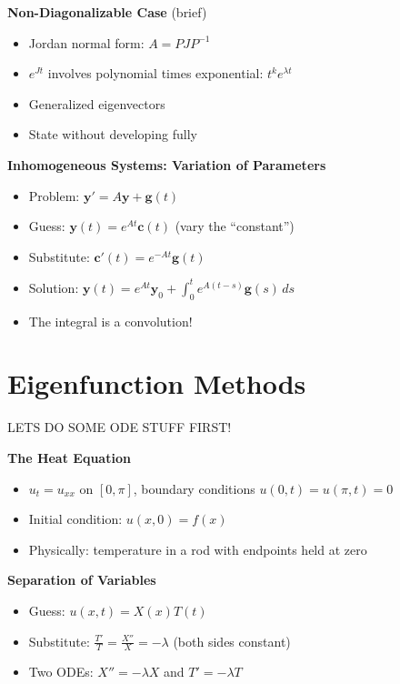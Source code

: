 \documentclass[
  10pt,
  letterpaper,
]{scrbook}
\providecommand{\tightlist}{%
  \setlength{\itemsep}{0pt}\setlength{\parskip}{0pt}}
\begin{document}
\textbf{Non-Diagonalizable Case} (brief)

\begin{itemize}
\tightlist
\item
  Jordan normal form: \(A = PJP^{-1}\)
\item
  \(e^{Jt}\) involves polynomial times exponential:
  \(t^k e^{\lambda t}\)
\item
  Generalized eigenvectors
\item
  State without developing fully
\end{itemize}

\textbf{Inhomogeneous Systems: Variation of Parameters}

\begin{itemize}
\tightlist
\item
  Problem: \(\mathbf{y}' = A\mathbf{y} + \mathbf{g}(t)\)
\item
  Guess: \(\mathbf{y}(t) = e^{At}\mathbf{c}(t)\) (vary the ``constant'')
\item
  Substitute: \(\mathbf{c}'(t) = e^{-At}\mathbf{g}(t)\)
\item
  Solution:
  \(\mathbf{y}(t) = e^{At}\mathbf{y}_0 + \int_0^t e^{A(t-s)}\mathbf{g}(s)\, ds\)
\item
  The integral is a convolution!
\end{itemize}

\section{Eigenfunction Methods}\label{eigenfunction-methods}

LETS DO SOME ODE STUFF FIRST!

\textbf{The Heat Equation}

\begin{itemize}
\tightlist
\item
  \(u_t = u_{xx}\) on \([0, \pi]\), boundary conditions
  \(u(0, t) = u(\pi, t) = 0\)
\item
  Initial condition: \(u(x, 0) = f(x)\)
\item
  Physically: temperature in a rod with endpoints held at zero
\end{itemize}

\textbf{Separation of Variables}

\begin{itemize}
\tightlist
\item
  Guess: \(u(x, t) = X(x)T(t)\)
\item
  Substitute: \(\frac{T'}{T} = \frac{X''}{X} = -\lambda\) (both sides
  constant)
\item
  Two ODEs: \(X'' = -\lambda X\) and \(T' = -\lambda T\)
\end{itemize}
\end{document}
